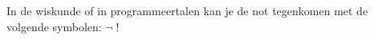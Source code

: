 In de wiskunde of in programmeertalen kan je de not tegenkomen met de volgende symbolen:
\begin{math}
\lnot \; !
\end{math}

